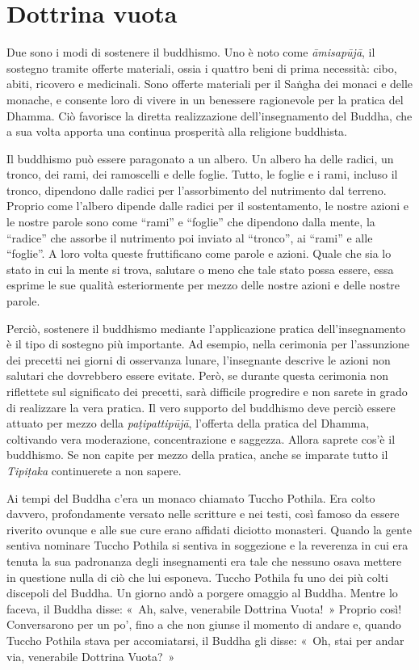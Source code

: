 \chapter{Dottrina vuota}

Due sono i modi di sostenere il buddhismo. Uno è noto come
\emph{āmisapūjā}, il sostegno tramite offerte materiali, ossia i quattro
beni di prima necessità: cibo, abiti, ricovero e medicinali. Sono
offerte materiali per il Saṅgha dei monaci e delle monache, e consente
loro di vivere in un benessere ragionevole per la pratica del Dhamma.
Ciò favorisce la diretta realizzazione dell'insegnamento del Buddha, che
a sua volta apporta una continua prosperità alla religione buddhista.

Il buddhismo può essere paragonato a un albero. Un albero ha delle
radici, un tronco, dei rami, dei ramoscelli e delle foglie. Tutto, le
foglie e i rami, incluso il tronco, dipendono dalle radici per
l'assorbimento del nutrimento dal terreno. Proprio come l'albero
dipende dalle radici per il sostentamento, le nostre azioni e le nostre
parole sono come ``rami'' e ``foglie'' che dipendono dalla mente, la
``radice'' che assorbe il nutrimento poi inviato al ``tronco'', ai
``rami'' e alle ``foglie''. A loro volta queste fruttificano come parole
e azioni. Quale che sia lo stato in cui la mente si trova, salutare o
meno che tale stato possa essere, essa esprime le sue qualità
esteriormente per mezzo delle nostre azioni e delle nostre parole.

Perciò, sostenere il buddhismo mediante l'applicazione pratica
dell'insegnamento è il tipo di sostegno più importante. Ad esempio,
nella cerimonia per l'assunzione dei precetti nei giorni di osservanza
lunare, l'insegnante descrive le azioni non salutari che dovrebbero
essere evitate. Però, se durante questa cerimonia non riflettete sul
significato dei precetti, sarà difficile progredire e non sarete in
grado di realizzare la vera pratica. Il vero supporto del buddhismo deve
perciò essere attuato per mezzo della \emph{paṭipattipūjā}, l'offerta
della pratica del Dhamma, coltivando vera moderazione, concentrazione e
saggezza. Allora saprete cos'è il buddhismo. Se non capite per mezzo
della pratica, anche se imparate tutto il \emph{Tipiṭaka} continuerete a
non sapere.

Ai tempi del Buddha c'era un monaco chiamato Tuccho Pothila. Era colto
davvero, profondamente versato nelle scritture e nei testi, così famoso
da essere riverito ovunque e alle sue cure erano affidati diciotto
monasteri. Quando la gente sentiva nominare Tuccho Pothila si sentiva in
soggezione e la reverenza in cui era tenuta la sua padronanza degli
insegnamenti era tale che nessuno osava mettere in questione nulla di
ciò che lui esponeva. Tuccho Pothila fu uno dei più colti discepoli del
Buddha. Un giorno andò a porgere omaggio al Buddha. Mentre lo faceva, il
Buddha disse: «~Ah, salve, venerabile Dottrina Vuota!~» Proprio così!
Conversarono per un po', fino a che non giunse il momento di andare e,
quando Tuccho Pothila stava per accomiatarsi, il Buddha gli disse: «~Oh,
stai per andar via, venerabile Dottrina Vuota?~»

